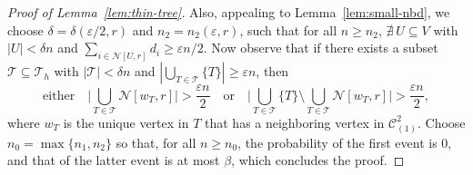 \documentclass[11pt,a4paper, reqno]{article}
\numberwithin{equation}{section}
\numberwithin{equation}{section}
\def\sss{\scriptscriptstyle}
\newcommand{\1}{\ensuremath{\mathbbm{1}}}
\numberwithin{equation}{section}
\numberwithin{theorem}{section}
\begin{document}
\begin{proof}[Proof of Lemma~\ref{lem:thin-tree}]
Also, appealing to Lemma~\ref{lem:small-nbd}, we choose $\delta = \delta(\varepsilon/2, r)$ and $n_2 = n_2(\varepsilon,r)$, 
such that for all $n\geq n_2$, $\nexists\ U\subseteq V$ with $|U|< \delta n$ and
$\sum_{i\in\mathcal{N}[U,r]}d_i\geq \varepsilon n/2$. 
Now observe that if there exists a subset $\mathcal{T}\subseteq\mathcal{T}_h$ with $|\mathcal{T}|<\delta n$ and $|\bigcup_{T\in\mathcal{T}}\{T\}|\geq \varepsilon n$, then 
$$\text{either}\quad\bigg|\bigcup_{T\in\mathcal{T}}\mathcal{N}[w_T,r]\bigg|>\frac{\varepsilon n}{2} \quad \text{or}\quad 
\bigg|\bigcup_{T\in\mathcal{T}}\{T\}\setminus \bigcup_{T\in\mathcal{T}}\mathcal{N}[w_T,r]\bigg|>\frac{\varepsilon n}{2},$$
where $w_T$ is the unique vertex in $T$ that has a neighboring vertex in $\mathscr{C}_{\sss (1)}^2$.
Choose $n_0 = \max\{n_1,n_2\}$ so that, for all $n\geq n_0$, the probability of the first event is 0, and that of the latter event is at most $\beta$, which concludes the proof.
\end{proof}
\end{document}
